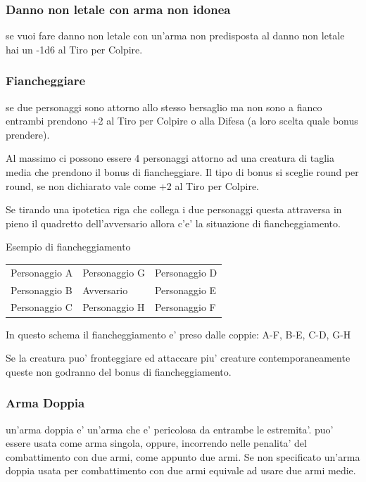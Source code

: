 \documentclass[a4paper,11pt,twoside,openany]{book}
\begin{document}
\subsubsection{Danno non letale con arma non idonea} se vuoi fare danno non letale con un'arma non predisposta al danno non letale hai un -1d6 al Tiro per Colpire.

\subsubsection{Fiancheggiare} se due personaggi sono attorno allo stesso bersaglio ma non sono a fianco entrambi prendono +2 al Tiro per Colpire o alla Difesa (a loro scelta quale bonus prendere).

Al massimo ci possono essere 4 personaggi attorno ad una creatura di taglia media che prendono il bonus di fiancheggiare. Il tipo di bonus si sceglie round per round, se non dichiarato vale come +2 al Tiro per Colpire.

Se tirando una ipotetica riga che collega i due personaggi questa attraversa in pieno il quadretto dell'avversario allora c'e' la situazione di fiancheggiamento.

\bigskip

Esempio di fiancheggiamento
\medskip
\begin{longtable}{L{3cm} k{3cm} k{3cm}}
\toprule
Personaggio A & Personaggio G & Personaggio D\tabularnewline
Personaggio B & Avversario & Personaggio E\tabularnewline
Personaggio C & Personaggio H & Personaggio F\tabularnewline
\end{longtable}

\bigskip

In questo schema il fiancheggiamento e' preso dalle coppie: A-F, B-E, C-D, G-H

\bigskip

Se la creatura puo' fronteggiare ed attaccare piu' creature contemporaneamente queste non godranno del bonus di fiancheggiamento.

\subsubsection{Arma Doppia} un'arma doppia e' un'arma che e' pericolosa da entrambe le estremita'. puo' essere usata come arma singola, oppure, incorrendo nelle penalita' del combattimento con due armi, come appunto due armi. Se non specificato un'arma doppia usata per combattimento con due armi equivale ad usare due armi medie.
\end{document}
